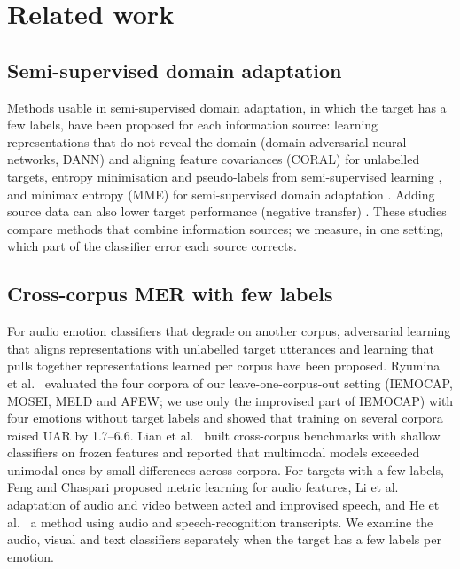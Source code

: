 \section{Related work}\label{sec:related}

\subsection{Semi-supervised domain adaptation}
Methods usable in semi-supervised domain adaptation, in which the target has a few labels, have been proposed for each information source: learning representations that do not reveal the domain (domain-adversarial neural networks, DANN) \cite{ganin2016dann} and aligning feature covariances (CORAL) \cite{sun2016coral} for unlabelled targets, entropy minimisation and pseudo-labels from semi-supervised learning \cite{grandvalet2004,lee2013pseudolabel}, and minimax entropy (MME) for semi-supervised domain adaptation \cite{saito2019mme}. Adding source data can also lower target performance (negative transfer) \cite{wang2019negative}. These studies compare methods that combine information sources; we measure, in one setting, which part of the classifier error each source corrects.

\subsection{Cross-corpus MER with few labels}\label{sec:rel-cc}
For audio emotion classifiers that degrade on another corpus, adversarial learning that aligns representations with unlabelled target utterances \cite{abdelwahab2018dann} and learning that pulls together representations learned per corpus \cite{gideon2021addog} have been proposed. Ryumina et al.\ \cite{ryumina2025} evaluated the four corpora of our leave-one-corpus-out setting (IEMOCAP, MOSEI, MELD and AFEW; we use only the improvised part of IEMOCAP) with four emotions without target labels and showed that training on several corpora raised UAR by 1.7--6.6\pt. Lian et al.\ \cite{lian2026merbench} built cross-corpus benchmarks with shallow classifiers on frozen features and reported that multimodal models exceeded unimodal ones by small differences across corpora. For targets with a few labels, Feng and Chaspari \cite{feng2023} proposed metric learning for audio features, Li et al.\ \cite{li2021acted} adaptation of audio and video between acted and improvised speech, and He et al.\ \cite{he2025m4ser} a method using audio and speech-recognition transcripts. We examine the audio, visual and text classifiers separately when the target has a few labels per emotion.

